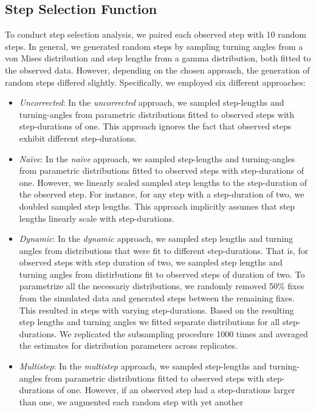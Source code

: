 \documentclass[abstract=on,10pt,a4paper,bibliography=totocnumbered]{article}
\begin{document}
\subsection{Step Selection Function}
To conduct step selection analysis, we paired each observed step with 10 random
steps. In general, we generated random steps by sampling turning angles from a
von Mises distribution and step lengths from a gamma distribution, both fitted
to the observed data. However, depending on the chosen approach, the generation
of random steps differed slightly. Specifically, we employed six different
approaches:
\begin{itemize}
  \item \textit{Uncorrected}: In the \textit{uncorrected} approach, we sampled
  step-lengths and turning-angles from parametric distributions fitted to
  observed steps with step-durations of one. This approach ignores the fact that
  observed steps exhibit different step-durations.
  \item \textit{Na\"ive}: In the \textit{na\"ive} approach, we sampled
  step-lengths and turning-angles from parametric distributions fitted to
  observed steps with step-durations of one. However, we linearly scaled sampled
  step lengths to the step-duration of the observed step. For instance, for any
  step with a step-duration of two, we doubled sampled step lengths. This
  approach implicitly assumes that step lengths linearly scale with
  step-durations.
  \item \textit{Dynamic}: In the \textit{dynamic} approach, we sampled step
  lengths and turning angles from distributions that were fit to different
  step-durations. That is, for observed steps with step duration of two, we
  sampled step lengths and turning angles from distirbutions fit to observed
  steps of duration of two. To parametrize all the necessariy distributions, we
  randomly removed 50\% fixes from the simulated data and generated steps
  between the remaining fixes. This resulted in steps with varying
  step-durations. Based on the resulting step lengths and turning angles we
  fitted separate distributions for all step-durations. We replicated the
  subsampling procedure 1000 times and averaged the estimates for distribution
  parameters across replicates.
  \item \textit{Multistep}: In the \textit{multistep} approach, we sampled
  step-lengths and turning-angles from parametric distributions fitted to
  observed steps with step-durations of one. However, if an observed step had a
  step-durations larger than one, we augmented each random step with yet another

\end{itemize}
\end{document}
